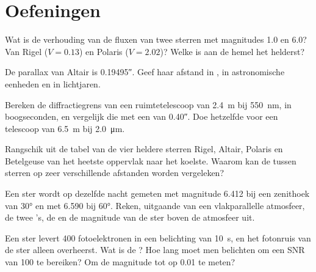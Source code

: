 \section{Oefeningen}

\begin{exercise}[$\star$]\label{exo:b1:observing-the-sky:1}
Wat is de verhouding van de fluxen van twee sterren met magnitudes 1.0 en 6.0? Van
Rigel ($V = 0.13$) en Polaris ($V = 2.02$)? Welke is aan de hemel het helderst?
\end{exercise}

\begin{exercise}[$\star$]\label{exo:b1:observing-the-sky:2}
De parallax van Altair is \ang{;;0.19495}. Geef haar afstand in , in
astronomische eenheden en in lichtjaren.
\end{exercise}

\begin{exercise}[$\star$]\label{exo:b1:observing-the-sky:3}
Bereken de diffractiegrens van een ruimtetelescoop van \qty{2.4}{m} bij \qty{550}{nm}, in
boogseconden, en vergelijk die met een  van \ang{;;0.40}. Doe hetzelfde voor een telescoop
van \qty{6.5}{m} bij \qty{2.0}{\micro\metre}.
\end{exercise}

\begin{exercise}[$\star$]\label{exo:b1:observing-the-sky:4}
Rangschik uit de tabel van de vier heldere sterren Rigel, Altair, Polaris en Betelgeuse van het
heetste oppervlak naar het koelste. Waarom kan de  tussen sterren op zeer
verschillende afstanden worden vergeleken?
\end{exercise}

\begin{exercise}[$\star\star$]\label{exo:b1:observing-the-sky:5}
Een ster wordt op dezelfde nacht gemeten met magnitude 6.412 bij een zenithoek van \ang{30} en
met 6.590 bij \ang{60}. Reken, uitgaande van een vlakparallelle atmosfeer, de twee 's,
de  en de magnitude van de ster boven de atmosfeer uit.
\end{exercise}

\begin{exercise}[$\star\star$]\label{exo:b1:observing-the-sky:6}
Een ster levert 400 fotoelektronen in een belichting van \qty{10}{s}, en het fotonruis van de ster
alleen overheerst. Wat is de ? Hoe lang moet men belichten om een SNR van 100
te bereiken? Om de magnitude tot op \num{0.01} te meten?
\end{exercise}

